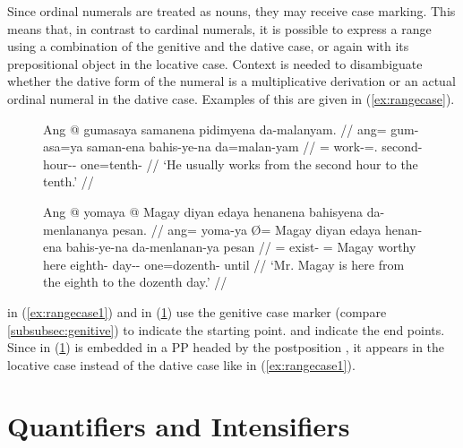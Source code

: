 Since ordinal numerals are treated as nouns, they may receive case marking.
This means that, in contrast to cardinal numerals, it is possible to express a
range using a combination of the genitive and the dative case, or again
 with its prepositional object in the locative case.
Context is needed to disambiguate whether the dative form of the numeral is a
multiplicative derivation or an actual ordinal numeral in the dative case.
Examples of this are given in (\ref{ex:rangecase}).

\begin{figure}[h]
\pex\label{ex:rangecase}
\a\label{ex:rangecase1}\begingl
	\gla Ang @ gumasaya samanena pidimyena da-malanyam. //
	\glb ang= gum-asa=ya saman-ena bahis-ye-na da=malan-yam //
	\glc \AgtT{}= work-\Hab{}=\TsgM{}.\Top{} second-\Gen{} hour-\Pl{}-\Gen{} 
		one=tenth-\Dat{} //
	\glft `He usually works from the second hour to the tenth.' //
\endgl

\a\label{ex:rangecase2}\begingl
	\gla Ang @ yomaya {} @ Magay diyan edaya henanena bahisyena da-menlananya 
		pesan. //
	\glb ang= yoma-ya Ø= Magay diyan edaya henan-ena bahis-ye-na 
		da-menlanan-ya pesan //
	\glc \AgtT{}= exist-\TsgM{} \Top{}= Magay worthy here eighth-\Gen{} 
		day-\Pl{}-\Gen{} one=dozenth-\Loc{} until //
	\glft `Mr. Magay is here from the eighth to the dozenth day.' //
\endgl
\xe
\end{figure}

 in (\ref{ex:rangecase1}) and
 in (\ref{ex:rangecase2}) use the
genitive case marker  (compare \autoref{subsubsec:genitive}) to
indicate the starting point.  and
 indicate 
the end points. Since  in (\ref{ex:rangecase2}) is 
embedded in a PP headed by the postposition , it appears in 
the locative case instead of the dative case like  in 
(\ref{ex:rangecase1}).


\section{Quantifiers and Intensifiers}
\label{sec:quantifiers}

